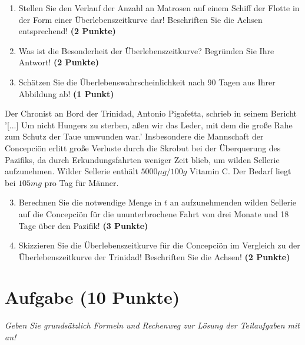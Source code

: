\documentclass[a4paper, 9pt]{scrartcl}\usepackage[]{graphicx}\usepackage[]{xcolor}
\begin{document}
\begin{enumerate}
\item Stellen Sie den Verlauf der Anzahl an Matrosen auf einem Schiff der Flotte in der Form einer Überlebenszeitkurve dar! Beschriften Sie die Achsen entsprechend! \textbf{(2 Punkte)} 
\item Was ist die Besonderheit der Überlebenszeitkurve? Begründen Sie Ihre Antwort! \textbf{(2 Punkte)} 
\item Schätzen Sie die Überlebenswahrscheinlichkeit nach 90 Tagen aus Ihrer Abbildung ab! \textbf{(1 Punkt)} 
\end{enumerate}

Der Chronist an Bord der Trinidad, Antonio Pigafetta, schrieb in seinem Bericht '[...] Um nicht Hungers zu sterben, aßen wir das Leder, mit dem die große Rahe zum Schutz der Taue umwunden war.' Insbesondere die Mannschaft der Concepciön erlitt große Verluste durch die Skrobut bei der Überquerung des Pazifiks, da durch Erkundungsfahrten weniger Zeit blieb, um wilden Sellerie aufzunehmen. Wilder Sellerie enthält $5000\mu g/100g$ Vitamin C. Der Bedarf liegt bei $105mg$ pro Tag für Männer.

\begin{enumerate}
  \setcounter{enumi}{2}
\item Berechnen Sie die notwendige Menge in $t$ an aufzunehmenden wilden Sellerie auf die Concepciön für die ununterbrochene Fahrt von drei Monate und 18 Tage über den Pazifik! \textbf{(3 Punkte)}
\item Skizzieren Sie die Überlebenszeitkurve für die Concepciön im Vergleich zu der Überlebenszeitkurve der Trinidad! Beschriften Sie die Achsen! \textbf{(2 Punkte)}
\end{enumerate}

 
\clearpage

\section{Aufgabe \hfill (10 Punkte)}

\textit{Geben Sie grundsätzlich Formeln und Rechenweg zur Lösung der Teilaufgaben mit an!} \\[1Ex]
 
\end{document}
